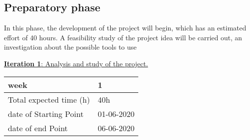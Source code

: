 \subsection{Preparatory phase}
In this phase, the development of the project will begin, which has an estimated effort of 40 hours. A feasibility study of the project idea will be carried out, an investigation about the possible tools to use


\large{\underline{\textbf{Iteration 1}: Analysis and study of the project.}}
\vspace{0.3cm}
\begin{table}[h!]
    \centering
    \begin{tabular}{|p{5cm}|p{4cm}|}
     \hline
        \cellcolor[gray]{0.9} week  & 1\\ \hline
        \cellcolor[gray]{0.9} Total expected time (h)  & 40h \\ \hline
        \cellcolor[gray]{0.9} date of Starting Point  & 01-06-2020 \\ \hline
        \cellcolor[gray]{0.9} date of end Point  & 06-06-2020 \\ \hline
            
\end{tabular}
\end{table}

